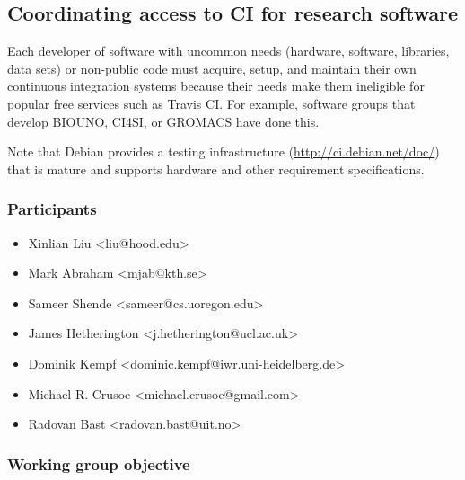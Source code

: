 \subsection{Coordinating access to CI for research software}
\label{sec:access}


Each developer of software with uncommon needs (hardware, software, libraries, data sets) or non-public code must acquire, setup, and maintain their own continuous integration systems because their needs make them ineligible for popular free services such as Travis CI.  For example, software groups that develop BIOUNO, CI4SI, or GROMACS have done this.  

Note that Debian provides a testing infrastructure (\href{https://ci.debian.net/doc/}{http://ci.debian.net/doc/}) that is mature and supports hardware and other requirement specifications. 



\subsubsection{Participants}

\begin{itemize}
  \item Xinlian Liu <liu@hood.edu>
  \item Mark Abraham <mjab@kth.se>
  \item Sameer Shende <sameer@cs.uoregon.edu>
  \item James Hetherington <j.hetherington@ucl.ac.uk>
  \item Dominik Kempf <dominic.kempf@iwr.uni-heidelberg.de>
  \item Michael R. Crusoe <michael.crusoe@gmail.com>
  \item Radovan Bast <radovan.bast@uit.no>
\end{itemize}

\subsubsection{Working group objective}

